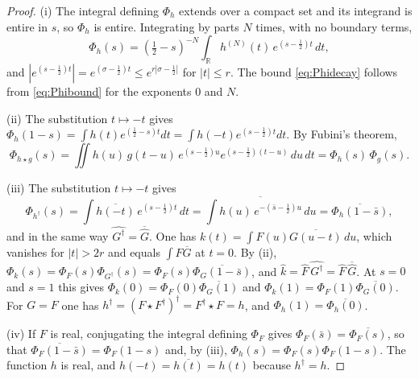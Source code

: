 \documentclass[11pt]{amsart}
\theoremstyle{remark}
\numberwithin{equation}{section}
\newcommand{\R}{\mathbb R}
\begin{document}
\begin{proof}
(i) The integral defining $\Phi_h$ extends over a compact set and its
integrand is entire in $s$, so $\Phi_h$ is entire.  Integrating by parts $N$
times, with no boundary terms,
\[
  \Phi_h(s)=(\tfrac12-s)^{-N}\int_\R h^{(N)}(t)\,e^{(s-\frac12)t}\,dt ,
\]
and $|e^{(s-\frac12)t}|=e^{(\sigma-\frac12)t}\le e^{r|\sigma-\frac12|}$ for
$|t|\le r$.  The bound \eqref{eq:Phidecay} follows from \eqref{eq:Phibound}
for the exponents $0$ and $N$.

(ii) The substitution $t\mapsto-t$ gives
$\Phi_h(1-s)=\int h(t)e^{(\frac12-s)t}dt=\int h(-t)e^{(s-\frac12)t}dt$.  By
Fubini's theorem,
\[
  \Phi_{h\star g}(s)=\iint h(u)\,g(t-u)\,e^{(s-\frac12)u}e^{(s-\frac12)(t-u)}
  \,du\,dt=\Phi_h(s)\,\Phi_g(s).
\]

(iii) The substitution $t\mapsto-t$ gives
\[
  \Phi_{h^\dagger}(s)=\int\overline{h(-t)}\,e^{(s-\frac12)t}\,dt
  =\overline{\int h(u)\,e^{-(\bar s-\frac12)u}\,du}
  =\overline{\Phi_h(1-\bar s)} ,
\]
and in the same way $\widehat{G^\dagger}=\overline{\hat G}$.  One has
$k(t)=\int F(u)\overline{G(u-t)}\,du$, which vanishes for $|t|>2r$ and equals
$\int F\overline G$ at $t=0$.  By (ii),
$\Phi_k(s)=\Phi_F(s)\Phi_{G^\dagger}(s)=\Phi_F(s)\overline{\Phi_G(1-\bar s)}$,
and $\hat k=\hat F\,\widehat{G^\dagger}=\hat F\,\overline{\hat G}$.  At
$s=0$ and $s=1$ this gives $\Phi_k(0)=\Phi_F(0)\overline{\Phi_G(1)}$ and
$\Phi_k(1)=\Phi_F(1)\overline{\Phi_G(0)}$.  For $G=F$ one has
$h^\dagger=(F\star F^\dagger)^\dagger=F^\dagger\star F=h$, and
$\Phi_h(1)=\overline{\Phi_h(0)}$.

(iv) If $F$ is real, conjugating the integral defining $\Phi_F$ gives
$\Phi_F(\bar s)=\overline{\Phi_F(s)}$, so that
$\overline{\Phi_F(1-\bar s)}=\Phi_F(1-s)$ and, by (iii),
$\Phi_h(s)=\Phi_F(s)\Phi_F(1-s)$.  The function $h$ is real, and
$h(-t)=\overline{h(t)}=h(t)$ because $h^\dagger=h$.
\end{proof}
\end{document}
